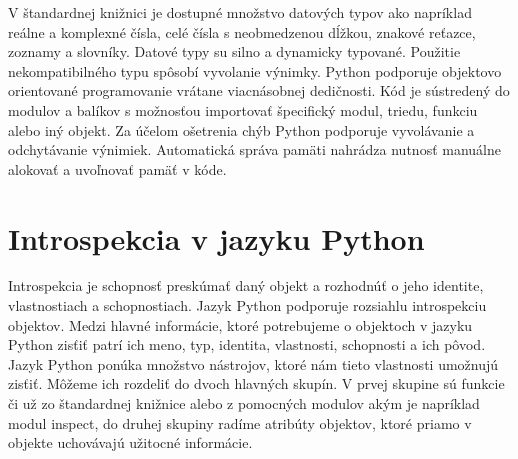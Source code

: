 \documentclass[11pt,oneside,final]{fithesis2}
\begin{document}
	V štandardnej knižnici je dostupné množstvo datových typov ako napríklad reálne a komplexné čísla, celé čísla s neobmedzenou dĺžkou, znakové reťazce, zoznamy a slovníky. Datové typy su silno a dynamicky typované. Použitie nekompatibilného typu spôsobí vyvolanie výnimky. Python podporuje objektovo orientované programovanie vrátane viacnásobnej dedičnosti. Kód je sústredený do modulov a balíkov s možnosťou importovať špecifický modul, triedu, funkciu alebo iný objekt. Za účelom ošetrenia chýb Python podporuje vyvolávanie a odchytávanie výnimiek. Automatická správa pamäti nahrádza nutnosť manuálne alokovať a uvoľnovať pamäť v kóde.


	\section{Introspekcia v jazyku Python}
		Introspekcia je schopnosť preskúmať daný objekt a rozhodnúť o jeho identite, vlastnostiach a schopnostiach. Jazyk Python podporuje rozsiahlu introspekciu objektov. Medzi hlavné informácie, ktoré potrebujeme o objektoch v jazyku Python zisťiť patrí ich meno, typ, identita, vlastnosti, schopnosti a ich pôvod. Jazyk Python ponúka množstvo nástrojov, ktoré nám tieto vlastnosti umožnujú zisťiť. Môžeme ich rozdeliť do dvoch hlavných skupín. V prvej skupine sú funkcie či už zo štandardnej knižnice alebo z pomocných modulov akým je napríklad modul inspect, do druhej skupiny radíme atribúty objektov, ktoré priamo v objekte uchovávajú užitocné informácie.
		
\end{document}
